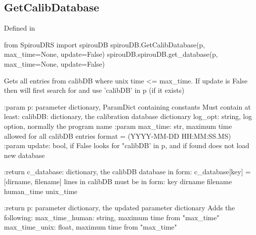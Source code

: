 \noindent\begin{minipage}{\textwidth}
\subsection{GetCalibDatabase}

Defined in \spirouCDB{}

\begin{pythonbox}
from SpirouDRS import spirouDB
spirouDB.GetCalibDatabase(p, max_time=None, update=False)
spirouDB.spirouDB.get_database(p, max_time=None, update=False)
\end{pythonbox}

\begin{pythondocstring}
Gets all entries from calibDB where unix time <= max_time.
If update is False then will first search for and use 'calibDB' in p
(if it exists)

:param p: parameter dictionary, ParamDict containing constants
    Must contain at least:
            calibDB: dictionary, the calibration database dictionary
            log_opt: string, log option, normally the program name
:param max_time: str, maximum time allowed for all calibDB entries
                 format = (YYYY-MM-DD HH:MM:SS.MS)
:param update: bool, if False looks for "calibDB' in p, and if found does
               not load new database

:return c_database: dictionary, the calibDB database in form:
                c_database[key] = [dirname, filename]
    lines in calibDB must be in form:
        {key} {dirname} {filename} {human_time} {unix_time}

:return p: parameter dictionary, the updated parameter dictionary
        Adds the following:
            max_time_human: string, maximum time from "max_time"
            max_time_unix: float, maximum time from "max_time"

\end{pythondocstring}
\end{minipage}

